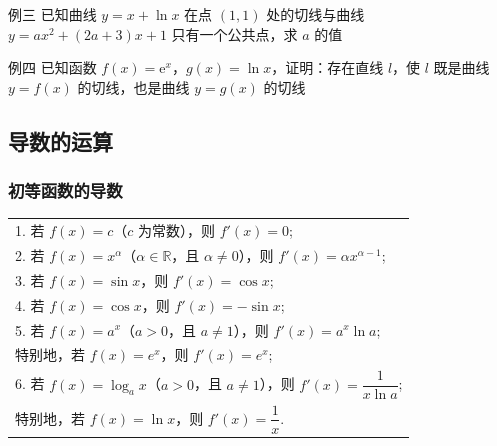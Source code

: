 \documentclass{article}
\begin{document}
\vspace{20\baselineskip}

例三 \;\;已知曲线 \(y = x + \ln x\) 在点 \((1, 1)\) 处的切线与曲线 \(y = ax^2 + (2a + 3)x + 1\) 只有一个公共点，求 \(a\) 的值

\vspace{15\baselineskip}

例四\;\; 已知函数 \(f(x) = \mathrm{e}^x\)，\(g(x) = \ln x\)，证明：存在直线 \(l\)，使 \(l\) 既是曲线 \(y = f(x)\) 的切线，也是曲线 \(y = g(x)\) 的切线
\newpage

\subsection{导数的运算}
\subsubsection{初等函数的导数}
\begin{table}[htbp]
  \centering
  \begin{tabular}{|p{}|}
    \hline
    \rowcolor{blue!20}
    \multicolumn{1}{|c|}{\large 基本初等函数的导数公式} \\
    \hline
    1. 若 \(f(x)=c\)（\(c\) 为常数），则 \(f'(x)=0\); \\[4pt]
    2. 若 \(f(x)=x^\alpha\)（\(\alpha\in\mathbb{R}\)，且 \(\alpha\neq0\)），则 \(f'(x)=\alpha x^{\alpha-1}\); \\[4pt]
    3. 若 \(f(x)=\sin x\)，则 \(f'(x)=\cos x\); \\[4pt]
    4. 若 \(f(x)=\cos x\)，则 \(f'(x)=-\sin x\); \\[4pt]
    5. 若 \(f(x)=a^x\)（\(a>0\)，且 \(a\neq1\)），则 \(f'(x)=a^x\ln a\); \\[4pt]
    \quad 特别地，若 \(f(x)=e^x\)，则 \(f'(x)=e^x\); \\[4pt]
    6. 若 \(f(x)=\log_a x\)（\(a>0\)，且 \(a\neq1\)），则 \(f'(x)=\dfrac{1}{x\ln a}\); \\[8pt]
    \quad 特别地，若 \(f(x)=\ln x\)，则 \(f'(x)=\dfrac{1}{x}.\) \\[4pt]
    \hline
  \end{tabular}
\end{table}
\end{document}
